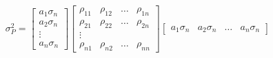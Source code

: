 \documentclass[11pt]{article}
\begin{document}
\[\sigma^2_P = \begin{bmatrix}
    a_1 \sigma_n \\
    a_2 \sigma_n \\
    \vdots \\
    a_n \sigma_n
\end{bmatrix} 
\begin{bmatrix}
    \rho_{11} & \rho_{12} & \dots & \rho_{1n}\\
    \rho_{21} & \rho_{22} & \dots & \rho_{2n}\\
    \vdots \\
    \rho_{n1} & \rho_{n2} & \dots & \rho_{nn}
\end{bmatrix} 
\begin{bmatrix}
    a_1 \sigma_n & a_2 \sigma_n & \dots & a_n \sigma_n
\end{bmatrix} 
\]
\end{document}
